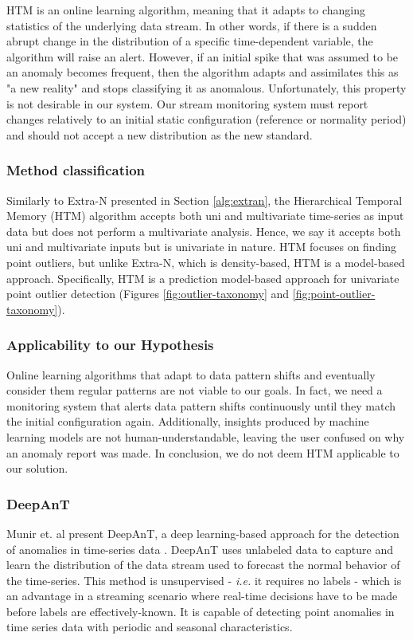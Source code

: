 HTM is an online learning algorithm, meaning that it adapts to changing statistics of the underlying data stream. In other words, if there is a sudden abrupt change in the distribution of a specific time-dependent variable, the algorithm will raise an alert. However, if an initial spike that was assumed to be an anomaly becomes frequent, then the algorithm adapts and assimilates this as "a new reality" and stops classifying it as anomalous. Unfortunately, this property is not desirable in our system. Our stream monitoring system must report changes relatively to an initial static configuration (reference or normality period) and should not accept a new distribution as the new standard.

\subsubsection*{Method classification}
Similarly to Extra-N presented in Section \ref{alg:extran}, the Hierarchical Temporal Memory (HTM) algorithm accepts both uni and multivariate time-series as input data but does not perform a multivariate analysis. Hence, we say it accepts both uni and multivariate inputs but is univariate in nature. HTM focuses on finding point outliers, but unlike Extra-N, which is density-based, HTM is a model-based approach. Specifically, HTM is a prediction model-based approach for univariate point outlier detection (Figures \ref{fig:outlier-taxonomy} and \ref{fig:point-outlier-taxonomy}).


\subsubsection*{Applicability to our Hypothesis}
Online learning algorithms that adapt to data pattern shifts and eventually consider them regular patterns are not viable to our goals. In fact, we need a monitoring system that alerts data pattern shifts continuously until they match the initial configuration again. Additionally, insights produced by machine learning models are not human-understandable, leaving the user confused on why an anomaly report was made. In conclusion, we do not deem HTM applicable to our solution.


\subsubsection{DeepAnT}
Munir et. al present DeepAnT, a deep learning-based approach for the detection of anomalies in time-series data \cite{Munir-DeepAnT}. DeepAnT uses unlabeled data to capture and learn the distribution of the data stream used to forecast the normal behavior of the time-series. This method is unsupervised - \textit{i.e.} it requires no labels - which is an advantage in a streaming scenario where real-time decisions have to be made before labels are effectively-known. It is capable of detecting point anomalies in time series data with periodic and seasonal characteristics.

